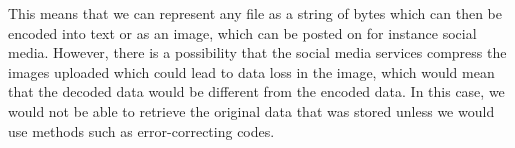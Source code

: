 This means that we can represent any file as a string of bytes which can then be encoded into text or as an image, which can be posted on for instance social media. However, there is a possibility that the social media services compress the images uploaded which could lead to data loss in the image, which would mean that the decoded data would be different from the encoded data. In this case, we would not be able to retrieve the original data that was stored unless we would use methods such as error-correcting codes.